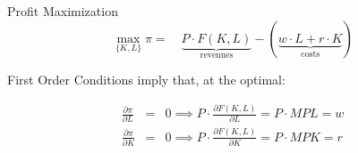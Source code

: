 \documentclass[notes,11pt, aspectratio=169, xcolor=table]{beamer}
\begin{document}
\begin{frame}{Profit Maximization}
  \begin{equation*}
    \max_{\{K,L\}} \pi = \quad \underbrace{P \cdot F(K,L)}_{\text{revenues}} - \left( \underbrace{w \cdot L + r \cdot K}_{\text{costs}} \right)
  \end{equation*}

  First Order Conditions imply that, at the optimal:

  \begin{eqnarray*}
    \frac{\partial \pi}{\partial L} &=& 0 \implies P \cdot \frac{\partial F(K,L)}{\partial L} = P \cdot MPL = w \\
    \frac{\partial \pi}{\partial K} &=& 0 \implies P \cdot \frac{\partial F(K,L)}{\partial K} =  P \cdot MPK = r 
  \end{eqnarray*}

\end{frame}
\end{document}

